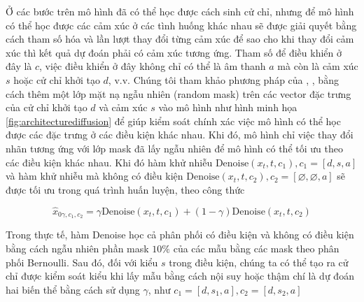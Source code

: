 Ở các bước trên mô hình đã có thể học được cách sinh cử chỉ, nhưng để mô hình có thể học được các cảm xúc ở các tình huống khác nhau sẽ được giải quyết bằng cách tham số hóa và lần lượt thay đổi từng cảm xúc để sao cho khi thay đổi cảm xúc thì kết quả dự đoán phải có cảm xúc tương ứng.
Tham số để điều khiển ở đây là $c$, việc điều khiển ở đây không chỉ có thể là âm thanh $a$ mà còn là cảm xúc $s$ hoặc cử chỉ khởi tạo $d$, v.v. Chúng tôi tham khảo phương pháp của \cite{ho2022classifier}, \cite{tevet2022human}, bằng cách thêm một lớp mặt nạ ngẫu nhiên (random mask) trên các vector đặc trưng của cử chỉ khởi tạo $d$ và cảm xúc $s$ vào mô hình như hình minh họa \autoref{fig:architecturediffusion} để giúp kiểm soát chính xác việc mô hình có thể học được các đặc trưng ở các điều kiện khác nhau. Khi đó, mô hình chỉ việc thay đổi nhãn tương ứng với lớp mask đã lấy ngẫu nhiên để mô hình có thể tối ưu theo các điều kiện khác nhau. Khi đó hàm khử nhiễu $\text{Denoise} \left(x_{t}, t, c_{1}\right), c_{1}=[d, s, a]$ và hàm khử nhiễu mà không có điều kiện $\text{Denoise} \left(x_{t}, t, c_{2}\right), c_{2}=[\varnothing, \varnothing, a]$ sẽ được tối ưu trong quá trình huấn luyện, theo công thức

\begin{equation} \label{eq:denoise}
\hat{x}_{0 \gamma, c_{1}, c_{2}}=\gamma \text{Denoise} \left(x_{t}, t, c_{1}\right)+(1-\gamma) \text{Denoise} \left(x_{t}, t, c_{2}\right)
\end{equation}


Trong thực tế, hàm Denoise học cả phân phối có điều kiện và không có điều kiện bằng cách ngẫu nhiên phần mask $10 \%$ của các mẫu bằng các mask theo phân phối Bernoulli. Sau đó, đối với kiểu $s$ trong điều kiện, chúng ta có thể tạo ra cử chỉ được kiểm soát kiểu khi lấy mẫu bằng cách nội suy hoặc thậm chí là dự đoán hai biến thể bằng cách sử dụng $\gamma$, như $c_{1}=\left[d, s_{1}, a\right], c_{2}=\left[d, s_{2}, a\right]$

